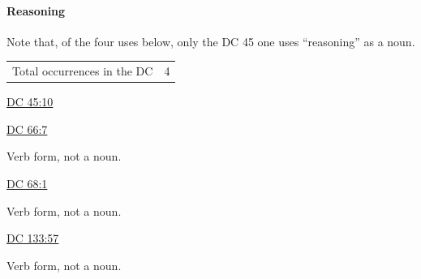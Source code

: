 		\paragraph{Reasoning}
		
			Note that, of the four uses below, only the DC 45 one uses ``reasoning'' as a noun.
	
			\begin{tabular}{ll}
				Total occurrences in the DC & 4
			\end{tabular}
			
			\begin{compactdesc}
				\item[{\hyperref[DC45-10]{DC 45:10}}]
				\item[{\hyperref[DC66-7]{DC 66:7}}]
					\begin{compactitem}
						\item Verb form, not a noun.
					\end{compactitem}
				\item[{\hyperref[DC68-1]{DC 68:1}}]
					\begin{compactitem}
						\item Verb form, not a noun.
					\end{compactitem}
				\item[{\hyperref[DC133-57]{DC 133:57}}]
					\begin{compactitem}
						\item Verb form, not a noun.
					\end{compactitem}
			\end{compactdesc}
		
	
		
		

